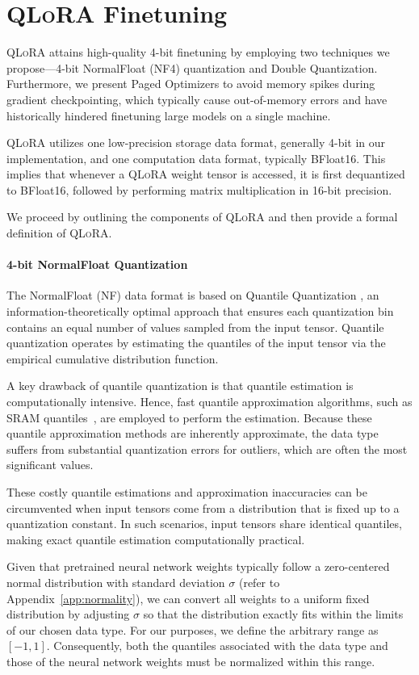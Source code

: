 \section{\textsc{QLoRA} Finetuning}

\textsc{QLoRA} attains high-quality 4-bit finetuning by employing two techniques we propose—4-bit NormalFloat (NF4) quantization and Double Quantization. Furthermore, we present Paged Optimizers to avoid memory spikes during gradient checkpointing, which typically cause out-of-memory errors and have historically hindered finetuning large models on a single machine.

\textsc{QLoRA} utilizes one low-precision storage data format, generally 4-bit in our implementation, and one computation data format, typically BFloat16. This implies that whenever a \textsc{QLoRA} weight tensor is accessed, it is first dequantized to BFloat16, followed by performing matrix multiplication in 16-bit precision.

We proceed by outlining the components of \textsc{QLoRA} and then provide a formal definition of \textsc{QLoRA}.

\paragraph{4-bit NormalFloat Quantization} The NormalFloat (NF) data format is based on Quantile Quantization \citep{dettmers2022optimizers}, an information-theoretically optimal approach that ensures each quantization bin contains an equal number of values sampled from the input tensor. Quantile quantization operates by estimating the quantiles of the input tensor via the empirical cumulative distribution function.

A key drawback of quantile quantization is that quantile estimation is computationally intensive. Hence, fast quantile approximation algorithms, such as SRAM quantiles~\citep{dettmers2022optimizers}, are employed to perform the estimation. Because these quantile approximation methods are inherently approximate, the data type suffers from substantial quantization errors for outliers, which are often the most significant values.

These costly quantile estimations and approximation inaccuracies can be circumvented when input tensors come from a distribution that is fixed up to a quantization constant. In such scenarios, input tensors share identical quantiles, making exact quantile estimation computationally practical.

Given that pretrained neural network weights typically follow a zero-centered normal distribution with standard deviation $\sigma$ (refer to Appendix~\ref{app:normality}), we can convert all weights to a uniform fixed distribution by adjusting $\sigma$ so that the distribution exactly fits within the limits of our chosen data type. For our purposes, we define the arbitrary range as $[-1, 1]$. Consequently, both the quantiles associated with the data type and those of the neural network weights must be normalized within this range.


